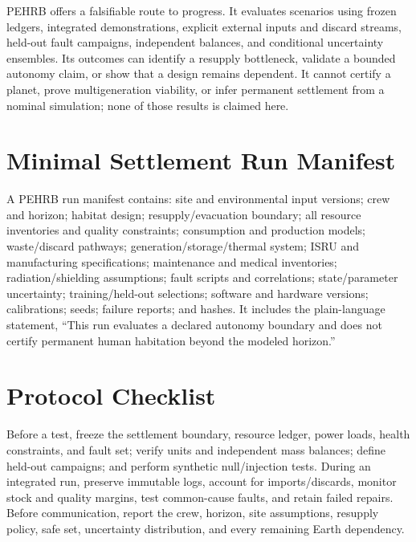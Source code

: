 \documentclass[10pt,conference]{IEEEtran}
\begin{document}
PEHRB offers a falsifiable route to progress. It evaluates scenarios using frozen ledgers, integrated demonstrations, explicit external inputs and discard streams, held-out fault campaigns, independent balances, and conditional uncertainty ensembles. Its outcomes can identify a resupply bottleneck, validate a bounded autonomy claim, or show that a design remains dependent. It cannot certify a planet, prove multigeneration viability, or infer permanent settlement from a nominal simulation; none of those results is claimed here.

\appendices
\section{Minimal Settlement Run Manifest}
\label{app:manifest}

A PEHRB run manifest contains: site and environmental input versions; crew and horizon; habitat design; resupply/evacuation boundary; all resource inventories and quality constraints; consumption and production models; waste/discard pathways; generation/storage/thermal system; ISRU and manufacturing specifications; maintenance and medical inventories; radiation/shielding assumptions; fault scripts and correlations; state/parameter uncertainty; training/held-out selections; software and hardware versions; calibrations; seeds; failure reports; and hashes. It includes the plain-language statement, ``This run evaluates a declared autonomy boundary and does not certify permanent human habitation beyond the modeled horizon.''

\section{Protocol Checklist}
\label{app:checklist}

Before a test, freeze the settlement boundary, resource ledger, power loads, health constraints, and fault set; verify units and independent mass balances; define held-out campaigns; and perform synthetic null/injection tests. During an integrated run, preserve immutable logs, account for imports/discards, monitor stock and quality margins, test common-cause faults, and retain failed repairs. Before communication, report the crew, horizon, site assumptions, resupply policy, safe set, uncertainty distribution, and every remaining Earth dependency.
\end{document}
